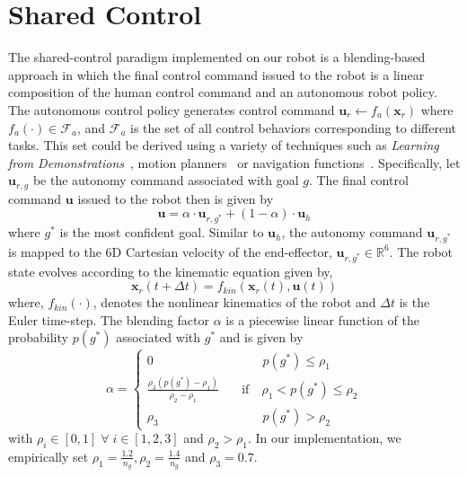 \documentclass[natbib, twocolumn]{svjour3}          %
\begin{document}
	
\section{Shared Control}\label{sec:shared-control}
The shared-control paradigm implemented on our robot is a blending-based approach in  which the final control command issued to the robot is a linear composition of the human control command and an autonomous robot policy.
The autonomous control policy generates control command
$\boldsymbol{u}_r \leftarrow f_{a}(\boldsymbol{x}_r)$
where $f_{a}(\cdot) \in \mathcal{F}_{a}$, and $\mathcal{F}_{a}$ is the set of all control behaviors corresponding to different tasks. This set could be derived using a variety of techniques such as \textit{Learning from Demonstrations}~\citep{argall2009survey, schaal1997learning}, motion planners~\citep{hsu2002randomized,ratliff2009chomp} or navigation functions~\citep{rimon1992exact,tanner2003nonholonomic}. Specifically, let $\boldsymbol{u}_{r,g}$ be the autonomy command associated with goal $g$. The final control command $\boldsymbol{u}$ issued to the robot then is given by
\begin{equation*}
\boldsymbol{u} = \alpha\cdot \boldsymbol{u}_{r,g^*} + (1 - \alpha)\cdot \boldsymbol{u}_h
\end{equation*}
where $g^*$ is the most confident goal. Similar to $\boldsymbol{u}_h$, the autonomy command $\boldsymbol{u}_{r, g^*}$ is mapped to the 6D Cartesian velocity of the end-effector, $\boldsymbol{u}_{r, g^*} \in \mathbb{R}^6$. The robot state evolves according to the kinematic equation given by,
\begin{equation*}
\boldsymbol{x}_r(t+\Delta t) = f_{kin}(\boldsymbol{x}_r(t), \boldsymbol{u}(t))
\end{equation*}
where, $f_{kin}(\cdot)$, denotes the nonlinear kinematics of the robot and $\Delta t$ is the Euler time-step.
  The blending factor $\alpha$ is a piecewise linear function of the probability $p(g^*)$ associated with $g^*$ and is given by
$$
\alpha = \left\{
\begin{array}{ll}
0 & \quad\quad~~~ p(g^*) \leq \rho_1 \\
\frac{\rho_3 (p(g^*) - \rho_1)}{\rho_2 - \rho_1}  &  \quad \text{if}\quad \rho_1 < p(g^*) \leq \rho_2  \\
\rho_3 & \quad\quad~~~ p(g^*) > \rho_2 	
\end{array}
\right.
$$
with $\rho_i \in [0, 1] \;\forall\; i \in [1,2,3]$ and $ \rho_2 > \rho_1$. 
In our implementation, we empirically set $\rho_1 = \frac{1.2}{n_g}, \rho_2 = \frac{1.4}{n_g}$ and $ \rho_3 = 0.7$.
\end{document}
